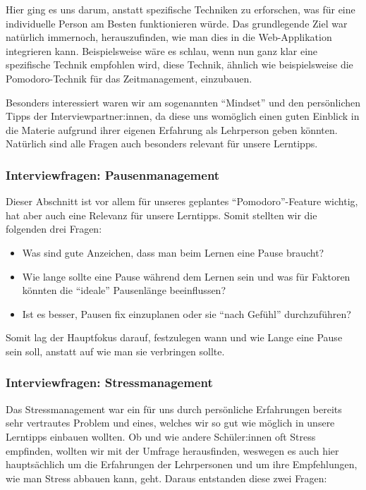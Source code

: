 \documentclass[12pt,a4paper]{report}
\begin{document}
Hier ging es uns darum, anstatt spezifische Techniken zu erforschen, was für eine individuelle Person am Besten funktionieren würde.
Das grundlegende Ziel war natürlich immernoch, herauszufinden, wie man dies in die Web-Applikation integrieren kann. 
Beispielsweise wäre es schlau, wenn nun ganz klar eine spezifische Technik empfohlen wird, diese Technik, ähnlich wie beispielsweise die Pomodoro-Technik für das Zeitmanagement, einzubauen.

Besonders interessiert waren wir am sogenannten \enquote{Mindset} und den persönlichen Tipps der Interviewpartner:innen, da diese uns womöglich einen guten Einblick in die Materie aufgrund ihrer eigenen Erfahrung als Lehrperson geben könnten.
Natürlich sind alle Fragen auch besonders relevant für unsere Lerntipps.

\subsubsection{Interviewfragen: Pausenmanagement}
Dieser Abschnitt ist vor allem für unseres geplantes \enquote{Pomodoro}-Feature wichtig, hat aber auch eine Relevanz für unsere Lerntipps. 
Somit stellten wir die folgenden drei Fragen:
\begin{itemize}
    \item Was sind gute Anzeichen, dass man beim Lernen eine Pause braucht?
    \item Wie lange sollte eine Pause während dem Lernen sein und was für Faktoren könnten die \enquote{ideale} Pausenlänge beeinflussen?
    \item Ist es besser, Pausen fix einzuplanen oder sie \enquote{nach Gefühl} durchzuführen?
\end{itemize}

Somit lag der Hauptfokus darauf, festzulegen wann und wie Lange eine Pause sein soll, anstatt auf wie man sie verbringen sollte.

\subsubsection{Interviewfragen: Stressmanagement}
Das Stressmanagement war ein für uns durch persönliche Erfahrungen bereits sehr vertrautes Problem und eines, welches wir so gut wie möglich in unsere Lerntipps einbauen wollten. 
Ob und wie andere Schüler:innen oft Stress empfinden, wollten wir mit der Umfrage herausfinden, weswegen es auch hier hauptsächlich um die Erfahrungen der Lehrpersonen und um ihre Empfehlungen, wie man Stress abbauen kann, geht.
Daraus entstanden diese zwei Fragen:
\end{document}
